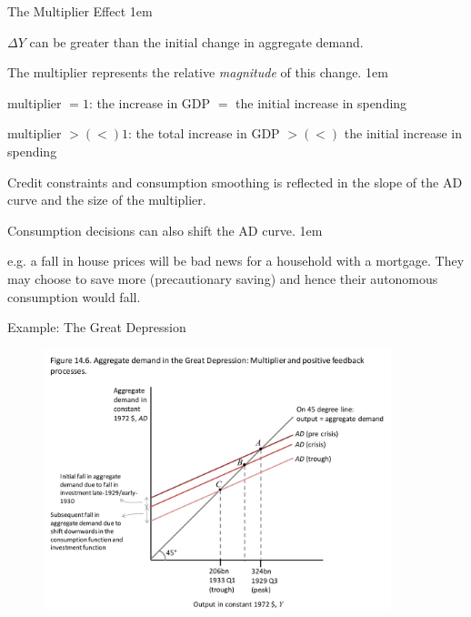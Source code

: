 \documentclass[11pt,aspectratio=43,usenames,dvipsnames]{beamer}
\let\olditemize=\itemize
\let\endolditemize=\enditemize
\renewenvironment{itemize}{\olditemize \itemsep1em}{\endolditemize}
\theoremstyle{definition}
\begin{document}
\begin{frame}{The Multiplier Effect}
\label{slide:The_Multiplier_Effect}
    \begin{itemize}
        \item $ \Delta Y $ can be greater than the initial change in aggregate demand.
        \item The multiplier represents the relative \textit{magnitude} of this change.
        \begin{itemize}
            \item multiplier $= 1$: the increase in GDP $ = $ the initial increase in spending
            \item multiplier $> (<) 1$: the total increase in GDP $> (<)$ the initial increase in spending
        \end{itemize}
        \item Credit constraints and consumption smoothing is reflected in the slope of the AD curve and the size of the multiplier.
        \item Consumption decisions can also shift the AD curve.
        \begin{itemize}
            \item e.g. a fall in house prices will be bad news for a household with a mortgage. They may choose to save more (precautionary saving) and hence their autonomous consumption would fall.
        \end{itemize}

    \end{itemize}
\end{frame}

\begin{frame}{Example: The Great Depression}
\label{slide:Example__The_Great_Depression}

    \begin{figure}
        \centering
        \includegraphics[width=0.9\textwidth]{./figures/7.pdf}
        \caption{}
    \end{figure}
\end{frame}
\end{document}
